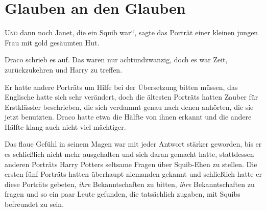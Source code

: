 \chapter{Glauben an den Glauben}


\lettrine[ante=„]{U}{nd} dann noch Janet, die ein Squib war“, sagte das Porträt einer kleinen jungen Frau mit gold gesäumten Hut.

Draco schrieb es auf. Das waren nur achtundzwanzig, doch es war Zeit, zurückzukehren und Harry zu treffen.

Er hatte andere Porträts um Hilfe bei der Übersetzung bitten müssen, das Englische hatte sich sehr verändert, doch die ältesten Porträts hatten Zauber für Erstklässler beschrieben, die sich verdammt genau nach denen anhörten, die sie jetzt benutzten. Draco hatte etwa die Hälfte von ihnen erkannt und die andere Hälfte klang auch nicht viel mächtiger.

Das flaue Gefühl in seinem Magen war mit jeder Antwort stärker geworden, bis er es schließlich nicht mehr ausgehalten und sich daran gemacht hatte, stattdessen anderen Porträts Harry Potters seltsame Fragen über Squib-Ehen zu stellen. Die ersten fünf Porträts hatten überhaupt niemanden gekannt und schließlich hatte er diese Porträts gebeten, \emph{ihre} Bekanntschaften zu bitten, \emph{ihre} Bekanntschaften zu fragen und so ein paar Leute gefunden, die tatsächlich zugaben, mit Squibs befreundet zu sein.

